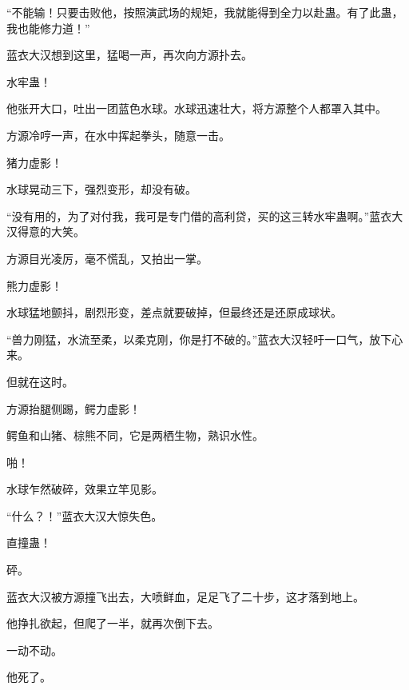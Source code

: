 \begin{this_body}
“不能输！只要击败他，按照演武场的规矩，我就能得到全力以赴蛊。有了此蛊，我也能修力道！”

蓝衣大汉想到这里，猛喝一声，再次向方源扑去。

水牢蛊！

他张开大口，吐出一团蓝色水球。水球迅速壮大，将方源整个人都罩入其中。

方源冷哼一声，在水中挥起拳头，随意一击。

猪力虚影！

水球晃动三下，强烈变形，却没有破。

“没有用的，为了对付我，我可是专门借的高利贷，买的这三转水牢蛊啊。”蓝衣大汉得意的大笑。

方源目光凌厉，毫不慌乱，又拍出一掌。

熊力虚影！

水球猛地颤抖，剧烈形变，差点就要破掉，但最终还是还原成球状。

“兽力刚猛，水流至柔，以柔克刚，你是打不破的。”蓝衣大汉轻吁一口气，放下心来。

但就在这时。

方源抬腿侧踢，鳄力虚影！

鳄鱼和山猪、棕熊不同，它是两栖生物，熟识水性。

啪！

水球乍然破碎，效果立竿见影。

“什么？！”蓝衣大汉大惊失色。

直撞蛊！

砰。

蓝衣大汉被方源撞飞出去，大喷鲜血，足足飞了二十步，这才落到地上。

他挣扎欲起，但爬了一半，就再次倒下去。

一动不动。

他死了。

\end{this_body}


